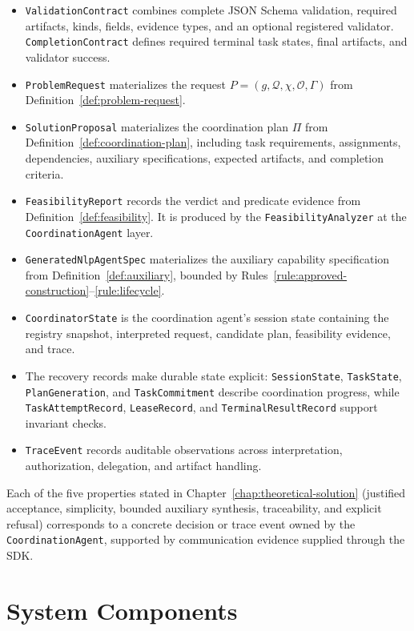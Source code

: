 \begin{itemize}
  \item \texttt{ValidationContract} combines complete JSON Schema validation, required artifacts, kinds, fields, evidence types, and an optional registered validator. \texttt{CompletionContract} defines required terminal task states, final artifacts, and validator success.
  \item \texttt{ProblemRequest} materializes the request $P = (g, \mathcal{Q}, \chi, \mathcal{O}, \Gamma)$ from Definition~\ref{def:problem-request}.
  \item \texttt{SolutionProposal} materializes the coordination plan $\Pi$ from Definition~\ref{def:coordination-plan}, including task requirements, assignments, dependencies, auxiliary specifications, expected artifacts, and completion criteria.
  \item \texttt{FeasibilityReport} records the verdict and predicate evidence from Definition~\ref{def:feasibility}. It is produced by the \texttt{FeasibilityAnalyzer} at the \texttt{CoordinationAgent} layer.
  \item \texttt{GeneratedNlpAgentSpec} materializes the auxiliary capability specification from Definition~\ref{def:auxiliary}, bounded by Rules~\ref{rule:approved-construction}--\ref{rule:lifecycle}.
  \item \texttt{CoordinatorState} is the coordination agent's session state containing the registry snapshot, interpreted request, candidate plan, feasibility evidence, and trace.
  \item The recovery records make durable state explicit: \texttt{SessionState}, \texttt{TaskState}, \texttt{PlanGeneration}, and \texttt{TaskCommitment} describe coordination progress, while \texttt{TaskAttemptRecord}, \texttt{LeaseRecord}, and \texttt{TerminalResultRecord} support invariant checks.
  \item \texttt{TraceEvent} records auditable observations across interpretation, authorization, delegation, and artifact handling.
\end{itemize}

Each of the five properties stated in Chapter~\ref{chap:theoretical-solution} (justified acceptance, simplicity, bounded auxiliary synthesis, traceability, and explicit refusal) corresponds to a concrete decision or trace event owned by the \texttt{CoordinationAgent}, supported by communication evidence supplied through the SDK.

\section{System Components}

